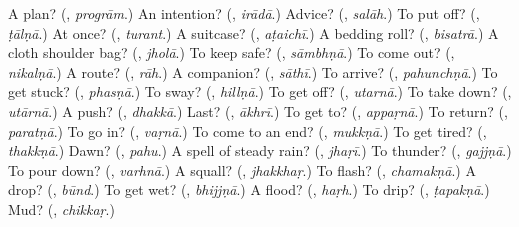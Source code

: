 \begin{tcolorbox}[breakable,colback=teal!4,colframe=teal!35!black,title={Before you move on}]
A plan? (\textbf{}, \emph{progrām}.) An intention? (\textbf{}, \emph{irādā}.) Advice? (\textbf{}, \emph{salāh}.) To put off? (\textbf{}, \emph{ṭālṇā}.) At once? (\textbf{}, \emph{turant}.) A suitcase? (\textbf{}, \emph{aṭaichī}.) A bedding roll? (\textbf{}, \emph{bisatrā}.) A cloth shoulder bag? (\textbf{}, \emph{jholā}.) To keep safe? (\textbf{}, \emph{sāmbhṇā}.) To come out? (\textbf{}, \emph{nikalṇā}.) A route? (\textbf{}, \emph{rāh}.) A companion? (\textbf{}, \emph{sāthī}.) To arrive? (\textbf{}, \emph{pahunchṇā}.) To get stuck? (\textbf{}, \emph{phasṇā}.) To sway? (\textbf{}, \emph{hillṇā}.) To get off? (\textbf{}, \emph{utarnā}.) To take down? (\textbf{}, \emph{utārnā}.) A push? (\textbf{}, \emph{dhakkā}.) Last? (\textbf{}, \emph{ākhrī}.) To get to? (\textbf{}, \emph{appaṛnā}.) To return? (\textbf{}, \emph{paratṇā}.) To go in? (\textbf{}, \emph{vaṛnā}.) To come to an end? (\textbf{}, \emph{mukkṇā}.) To get tired? (\textbf{}, \emph{thakkṇā}.) Dawn? (\textbf{}, \emph{pahu}.) A spell of steady rain? (\textbf{}, \emph{jhaṛī}.) To thunder? (\textbf{}, \emph{gajjṇā}.) To pour down? (\textbf{}, \emph{varhnā}.) A squall? (\textbf{}, \emph{jhakkhaṛ}.) To flash? (\textbf{}, \emph{chamakṇā}.) A drop? (\textbf{}, \emph{būnd}.) To get wet? (\textbf{}, \emph{bhijjṇā}.) A flood? (\textbf{}, \emph{haṛh}.) To drip? (\textbf{}, \emph{ṭapakṇā}.) Mud? (\textbf{}, \emph{chikkaṛ}.)
\end{tcolorbox}
